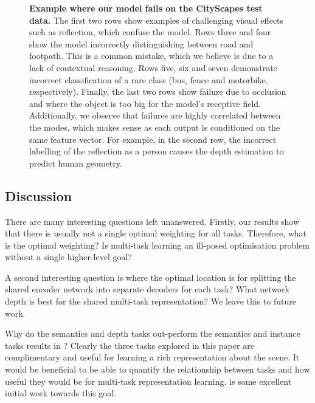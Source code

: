 {\begin{figure}[t]
	\caption[Failure examples.]{\textbf{Example where our model fails on the CityScapes test data.} The first two rows show examples of challenging visual effects such as reflection, which confuse the model. Rows three and four show the model incorrectly distinguishing between road and footpath. This is a common mistake, which we believe is due to a lack of contextual reasoning. Rows five, six and seven demonstrate incorrect classification of a rare class (bus, fence and motorbike, respectively). Finally, the last two rows show failure due to occlusion and where the object is too big for the model's receptive field. Additionally, we observe that failures are highly correlated between the modes, which makes sense as each output is conditioned on the same feature vector. For example, in the second row, the incorrect labelling of the reflection as a person causes the depth estimation to predict human geometry.}
	\label{fig:fail}
\end{figure}
\clearpage%
}

\subsection{Discussion}

There are many interesting questions left unanswered. Firstly, our results show that there is usually not a single optimal weighting for all tasks. Therefore, what is the optimal weighting? Is multi-task learning an ill-posed optimisation problem without a single higher-level goal?

A second interesting question is where the optimal location is for splitting the shared encoder network into separate decoders for each task? What network depth is best for the shared multi-task representation? We leave this to future work.

Why do the semantics and depth tasks out-perform the semantics and instance tasks results in ? Clearly the three tasks explored in this paper are complimentary and useful for learning a rich representation about the scene. It would be beneficial to be able to quantify the relationship between tasks and how useful they would be for multi-task representation learning. \citep{zamir2018taskonomy} is some excellent initial work towards this goal.

